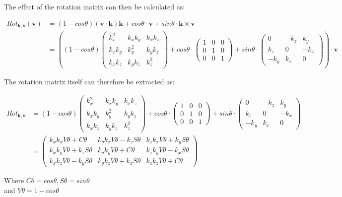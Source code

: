 The effect of the rotation matrix can then be calculated as:

\begin{align*}
Rot_{\textbf{k},\theta}(\textbf{v}) &= (1-cos\theta)(\textbf{v}\cdot\textbf{k})\textbf{k}+cos\theta\cdot\textbf{v}+sin\theta\cdot\textbf{k}\times\textbf{v}\\
&= \left((1-cos\theta) 
\begin{pmatrix}
k_x^2 & k_xk_y & k_xk_z \\
k_xk_y & k_y^2 & k_yk_z \\
k_xk_z & k_yk_z & k_z^2
\end{pmatrix}+cos\theta\cdot
\begin{pmatrix}
1 & 0 & 0 \\
0 & 1 & 0 \\
0 & 0 & 1
\end{pmatrix}+sin\theta\cdot
\begin{pmatrix}
0 & -k_z & k_y\\
k_z & 0 & -k_x\\
-k_y & k_x & 0
\end{pmatrix}\right)\cdot\textbf{v}
\end{align*}

The rotation matrix itself can therefore be extracted as:

\begin{align*}
Rot_{\textbf{k},\theta} &= 
(1-cos\theta) 
\begin{pmatrix}
k_x^2 & k_xk_y & k_xk_z \\
k_xk_y & k_y^2 & k_yk_z \\
k_xk_z & k_yk_z & k_z^2
\end{pmatrix}+cos\theta\cdot
\begin{pmatrix}
1 & 0 & 0 \\
0 & 1 & 0 \\
0 & 0 & 1
\end{pmatrix}+sin\theta\cdot
\begin{pmatrix}
0 & -k_z & k_y\\
k_z & 0 & -k_x\\
-k_y & k_x & 0
\end{pmatrix}\\
&= 
\begin{pmatrix}
k_xk_xV\theta+C\theta & k_yk_xV\theta-k_zS\theta & k_zk_xV\theta+k_yS\theta \\
k_xk_yV\theta+k_zS\theta & k_yk_yV\theta+C\theta & k_zk_yV\theta-k_xS\theta \\
k_xk_zV\theta-k_yS\theta & k_yk_zV\theta+k_xS\theta & k_zk_zV\theta+C\theta
\end{pmatrix}
\end{align*}

Where $C\theta = cos\theta, S\theta = sin\theta$\\
and $V\theta=1-cos\theta$












